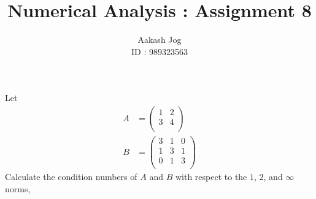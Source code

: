\documentclass[fleqn, a4paper, 11pt, oneside]{amsart}
\title{Numerical Analysis : Assignment 8}
\author
{
	Aakash Jog\\
	ID : 989323563
}
\date{\formatdate{15}{12}{2015}}
\theoremstyle{definition}
\theoremstyle{theorem}
\begin{document}

\maketitle

\begin{question}
	Let
	\begin{align*}
		A &=
			\begin{pmatrix}
				1 & 2 \\
				3 & 4 \\
			\end{pmatrix}\\
		B &=
			\begin{pmatrix}
				3 & 1 & 0 \\
				1 & 3 & 1 \\
				0 & 1 & 3 \\
			\end{pmatrix}
	\end{align*}
	Calculate the condition numbers of $A$ and $B$ with respect to the $1$, $2$, and $\infty$ norms,
\end{question}
\end{document}
